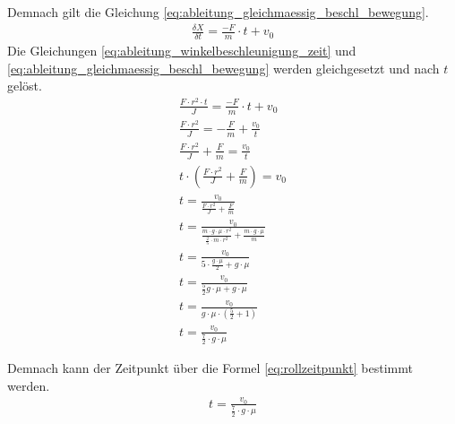 Demnach gilt die Gleichung \ref{eq:ableitung_gleichmaessig_beschl_bewegung}.
\begin{align}
    \frac{\delta X}{\delta t} = \frac{-F}{m} \cdot t + v_0\label{eq:ableitung_gleichmaessig_beschl_bewegung}
\end{align}
Die Gleichungen \ref{eq:ableitung_winkelbeschleunigung_zeit} und \ref{eq:ableitung_gleichmaessig_beschl_bewegung} werden gleichgesetzt und nach $t$ gelöst.
\begin{align}
    \frac{F \cdot r^2 \cdot t}{J} = \frac{-F}{m} \cdot t + v_0\\
    \frac{F \cdot r^2}{J} = -\frac{F}{m} + \frac{v_0}{t}\\
    \frac{F \cdot r^2}{J} + \frac{F}{m} = \frac{v_0}{t}\\
    t \cdot (\frac{F \cdot r^2}{J} + \frac{F}{m}) = v_0\\
    t = \frac{v_0}{\frac{F \cdot r^2}{J} + \frac{F}{m}}\\
    t = \frac{v_0}{\frac{m \cdot g \cdot \mu \cdot r^2}{\frac{2}{5} \cdot m \cdot r^2} + \frac{m \cdot g \cdot \mu}{m}}\\
    t = \frac{v_0}{5 \cdot \frac{g \cdot \mu}{2} + g \cdot \mu}\\
    t = \frac{v_0}{\frac{5}{2} g \cdot \mu + g \cdot \mu}\\
    t = \frac{v_0}{g \cdot \mu \cdot (\frac{5}{2} + 1)}\\
    t = \frac{v_0}{\frac{7}{2} \cdot g \cdot \mu}
\end{align}

Demnach kann der Zeitpunkt über die Formel \ref{eq:rollzeitpunkt} bestimmt werden.
\begin{align}
    t = \frac{v_0}{\frac{7}{2} \cdot g \cdot \mu}\label{eq:rollzeitpunkt}
\end{align}